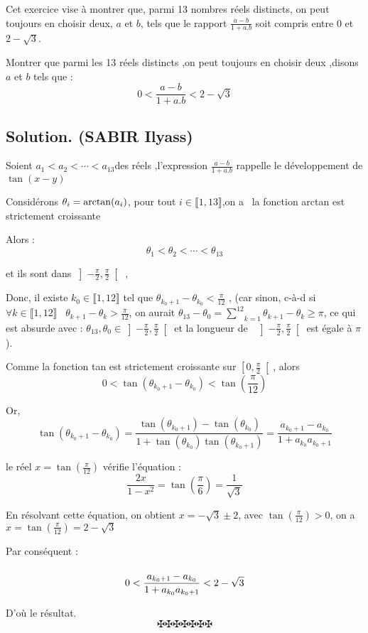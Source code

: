 Cet exercice vise {\`a} montrer que, parmi 13 nombres r{\'e}els distincts, on
peut toujours en choisir deux, $a$ et $b$, tels que le rapport $\frac{a - b}{1
+ a.b}$ soit compris entre $0$ et $2 - \sqrt{3}$.

\begin{exercise}[(Oral de l'X)]
Montrer que parmi les 13 r{\'e}els distincts ,on peut toujours en choisir deux
,disons $a$ et $b$ tels que :
\[ 0 < \frac{a - b}{1 + a.b} < 2 - \sqrt{3} \]

\end{exercise}

\subsection*{Solution. (SABIR Ilyass)}


Soient $a_1 < a_2 < \cdots < a_{13} $des r{\'e}els ,l'expression $\frac{a -
b}{1 + a.b}$ rappelle le d{\'e}veloppement de $\tan (x - y)$

Consid{\'e}rons $\tmcolor{black}{\theta_i = \arctan (a_i)}$, pour tout $i \in
\llbracket 1, 13 \rrbracket$,on a \ la fonction arctan est strictement
croissante

Alors :
\[ \theta_1 < \theta_2 < \cdots < \theta_{13} \]
\text{}

et ils sont dans $\left] - \frac{\pi}{2}, \frac{\pi}{2} \right[$ ,

Donc, il existe $k_0 \in \llbracket 1, 12 \rrbracket$ tel que $\theta_{k_0 +
1} - \theta_{k_0} < \frac{\pi}{12}$ , (car sinon, c-{\`a}-d si $\forall k  \in
\llbracket 1, 12 \rrbracket$ \ $\theta_{k  + 1} - \theta_{k } >
\frac{\pi}{12}$, on aurait $\theta_{13} - \theta_0 = \underset{k =
1}{\overset{12}{\sum}} \theta_{k  + 1} - \theta_{k } \geqslant \pi$, ce qui
est absurde avec : $\theta_{13}, \theta_0 \in \left] - \frac{\pi}{2},
\frac{\pi}{2} \right[$ et la longueur de \ $\left] - \frac{\pi}{2},
\frac{\pi}{2} \right[$ est {\'e}gale {\`a} $\pi$).

Comme la fonction tan est strictement croissante sur $\left[ 0, \frac{\pi}{2}
\right[$, alors
\[ 0 < \tan (\theta_{k_0 + 1} - \theta_{k_0}) < \tan \left( \frac{\pi}{12}
   \right) \]


Or,
\[ \tan (\theta_{k_0 + 1} - \theta_{k_0}) = \frac{\tan (\theta_{k_0 + 1}) -
   \tan (\theta_{k_0})}{1 + \tan (\theta_{k_0}) \tan (\theta_{k_0 + 1})} =
   \frac{a_{k_0 + 1} - a_{k_0}}{1 + a_{k_0} a_{k_0 + 1}} \]


le r{\'e}el $x = \tan \left( \frac{\pi}{12} \right)$ v{\'e}rifie
l'{\'e}quation :
\[ \frac{2 x}{1 - x^2} = \tan \left( \frac{\pi}{6} \right) =
   \frac{1}{\sqrt{3}} \]


En r{\'e}solvant cette {\'e}quation, on obtient $x = - \sqrt{3} \pm 2$, avec
$\tan \left( \frac{\pi}{12} \right) > 0$, on a $x = \tan \left( \frac{\pi}{12}
\right) = 2 - \sqrt{3}$

Par cons{\'e}quent :

\[  \]
\[ {\color[HTML]{000000}0 < \frac{a_{k_0 + 1} - a_{k_0}}{1 + a_{k_0} a_{k_0 +
   1}} < 2 - \sqrt{3}} \]


D'o{\`u} le r{\'e}sultat.
\[ \maltese \maltese \maltese \maltese \maltese \maltese \maltese \]
